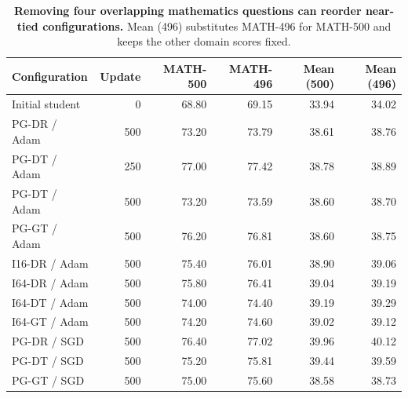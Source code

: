 \begin{table}[t]
\centering
\small
\setlength{\tabcolsep}{5pt}
\caption{\textbf{Removing four overlapping mathematics questions can reorder near-tied configurations.} Mean (496) substitutes MATH-496 for MATH-500 and keeps the other domain scores fixed.}
\label{tab:math496_sensitivity}
\begin{tabular}{lrrrrr}
\toprule
Configuration & Update & MATH-500 & MATH-496 & Mean (500) & Mean (496) \\
\midrule
Initial student & 0 & 68.80 & 69.15 & 33.94 & 34.02 \\
PG-DR / Adam & 500 & 73.20 & 73.79 & 38.61 & 38.76 \\
PG-DT / Adam & 250 & 77.00 & 77.42 & 38.78 & 38.89 \\
PG-DT / Adam & 500 & 73.20 & 73.59 & 38.60 & 38.70 \\
PG-GT / Adam & 500 & 76.20 & 76.81 & 38.60 & 38.75 \\
I16-DR / Adam & 500 & 75.40 & 76.01 & 38.90 & 39.06 \\
I64-DR / Adam & 500 & 75.80 & 76.41 & 39.04 & 39.19 \\
I64-DT / Adam & 500 & 74.00 & 74.40 & 39.19 & 39.29 \\
I64-GT / Adam & 500 & 74.20 & 74.60 & 39.02 & 39.12 \\
PG-DR / SGD & 500 & 76.40 & 77.02 & 39.96 & 40.12 \\
PG-DT / SGD & 500 & 75.20 & 75.81 & 39.44 & 39.59 \\
PG-GT / SGD & 500 & 75.00 & 75.60 & 38.58 & 38.73 \\
\bottomrule
\end{tabular}
\end{table}
